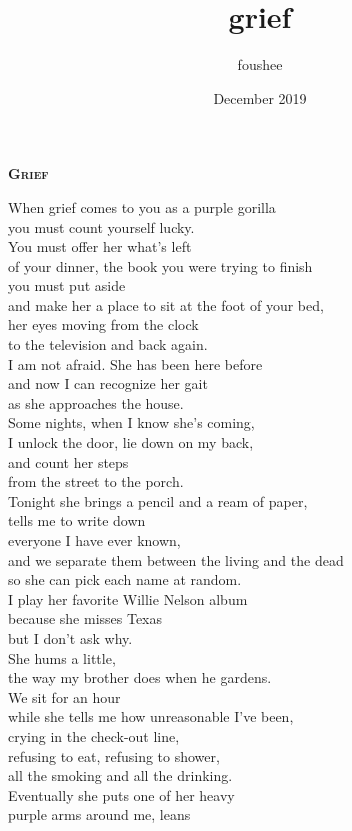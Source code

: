 \documentclass{memoir}
\title{grief}
\author{foushee }
\date{December 2019}
\begin{document}
\thispagestyle{empty}
\noindent \textbf{\textsc{\Large Grief}}
\vspace{18pt}

When grief comes to you as a purple gorilla\\
you must count yourself lucky.\\
You must offer her what's left\\
of your dinner, the book you were trying to finish\\
you must put aside\\
and make her a place to sit at the foot of your bed,\\
her eyes moving from the clock\\
to the television and back again.\\
I am not afraid. She has been here before\\
and now I can recognize her gait\\
as she approaches the house.\\
Some nights, when I know she's coming,\\
I unlock the door, lie down on my back,\\
and count her steps\\
from the street to the porch.\\
Tonight she brings a pencil and a ream of paper,\\
tells me to write down\\
everyone I have ever known,\\
and we separate them between the living and the dead\\
so she can pick each name at random.\\
I play her favorite Willie Nelson album\\
because she misses Texas\\
but I don't ask why.\\
She hums a little,\\
the way my brother does when he gardens.\\
We sit for an hour\\
while she tells me how unreasonable I've been,\\
crying in the check-out line,\\
refusing to eat, refusing to shower,\\
all the smoking and all the drinking.\\
Eventually she puts one of her heavy\\
purple arms around me, leans\\
\end{document}
